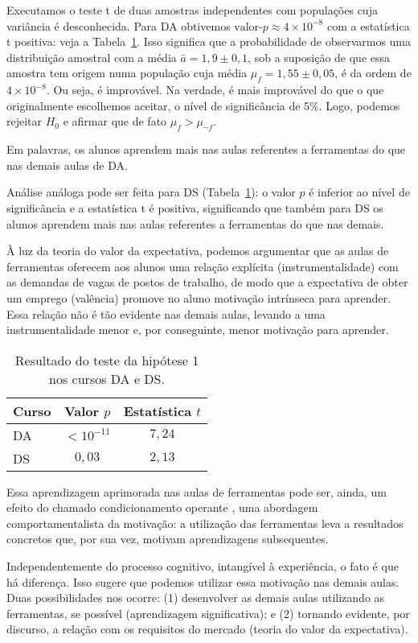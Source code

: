 Executamos o teste t de duas amostras independentes com populações cuja variância é desconhecida.
Para DA obtivemos $\text{valor-}p \approx 4\times10^{-8}$ com a estatística t positiva: veja a Tabela~\ref{tab:hipotese-1}.
Isso significa que a probabilidade de observarmos uma distribuição amostral com a média $\bar a = 1,9\pm 0,1$, sob a suposição de que essa amostra tem origem numa população cuja média $\mu_f = 1,55\pm 0,05$, é da ordem de $4\times10^{-8}$.
Ou seja, é improvável.
Na verdade, é mais improvável do que o que originalmente escolhemos aceitar, o nível de significância de 5\%.
Logo, podemos rejeitar $H_0$ e afirmar que de fato $\mu_{f} > \mu_{\neg f}$.

Em palavras, os alunos aprendem mais nas aulas referentes a ferramentas do que nas demais aulas de DA.


Análise análoga pode ser feita para DS (Tabela~\ref{tab:hipotese-1}): o valor $p$ é inferior ao nível de significância e a estatística t é positiva, significando que também para DS os alunos aprendem mais nas aulas referentes a ferramentas do que nas demais.

À luz da teoria do valor da expectativa, podemos argumentar que as aulas de ferramentas oferecem aos alunos uma relação explícita (instrumentalidade) com as demandas de vagas de postos de trabalho, de modo que a expectativa de obter um emprego (valência) promove no aluno motivação intrínseca para aprender.
Essa relação não é tão evidente nas demais aulas, levando a uma instrumentalidade menor e, por conseguinte, menor motivação para aprender.


\begin{table}
	\centering
	\caption{Resultado do teste da hipótese 1 nos cursos DA e DS.}
	\label{tab:hipotese-1}

	\begin{tabular}{lcc}
	\toprule
	Curso & Valor $p$   & Estatística $t$ \\
	\midrule
	DA    & $<10^{-11}$ & $7,24$ \\
	DS    & $0,03$      & $2,13$ \\ 
	\bottomrule
	\end{tabular}
\end{table}

Essa aprendizagem aprimorada nas aulas de ferramentas pode ser, ainda, um efeito do chamado condicionamento operante \cite{Petri}, uma abordagem comportamentalista da motivação: a utilização das ferramentas leva a resultados concretos que, por sua vez, motivam aprendizagens subsequentes.

Independentemente do processo cognitivo, intangível à experiência, o fato é que há diferença.
Isso sugere que podemos utilizar essa motivação nas demais aulas.
Duas possibilidades nos ocorre: (1) desenvolver as demais aulas utilizando as ferramentas, se possível (aprendizagem significativa); e (2) tornando evidente, por discurso, a relação com os requisitos do mercado (teoria do valor da expectativa).